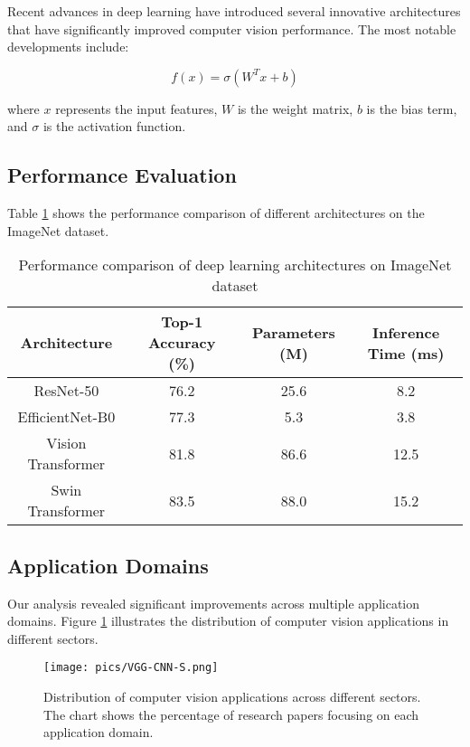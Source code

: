 \documentclass[conference, compsoc, twoside]{IEEEtran}
\begin{document}
Recent advances in deep learning have introduced several innovative architectures that have significantly improved computer vision performance. The most notable developments include:

\begin{equation}
f(x) = \sigma(W^T x + b)
\label{eq:activation}
\end{equation}

where $x$ represents the input features, $W$ is the weight matrix, $b$ is the bias term, and $\sigma$ is the activation function.

\subsection{Performance Evaluation}

Table \ref{tab:performance} shows the performance comparison of different architectures on the ImageNet dataset.

\begin{table}[ht]
\centering
	\begin{center}
		\caption{Performance comparison of deep learning architectures on ImageNet dataset}
		\label{tab:performance}
		\small
		\begin{tabular}{ c  c  c  c }
			\hline
			Architecture & Top-1 Accuracy (\%) & Parameters (M) & Inference Time (ms)\\
			\hline
			ResNet-50 & 76.2 & 25.6 & 8.2 \\
			EfficientNet-B0 & 77.3 & 5.3 & 3.8 \\
			Vision Transformer & 81.8 & 86.6 & 12.5 \\
			Swin Transformer & 83.5 & 88.0 & 15.2 \\
			\hline
		\end{tabular}
	\end{center}
\end{table}

\subsection{Application Domains}

Our analysis revealed significant improvements across multiple application domains. Figure \ref{fig:applications} illustrates the distribution of computer vision applications in different sectors.

\begin{figure}[h]
	\begin{center}
		\texttt{[image: pics/VGG-CNN-S.png]}
		\caption{Distribution of computer vision applications across different sectors. The chart shows the percentage of research papers focusing on each application domain.}
		\label{fig:applications}
	\end{center}
\end{figure}
\end{document}

